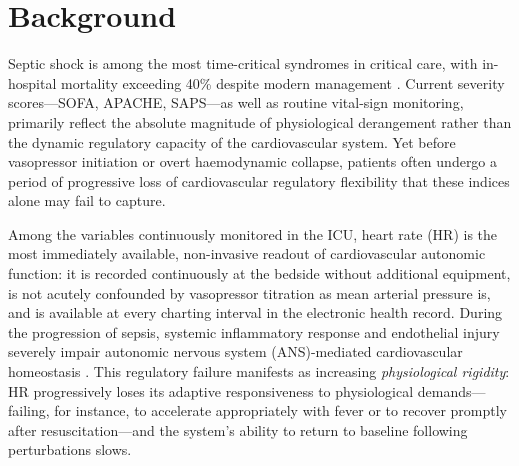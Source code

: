 \documentclass[referee,lineno,pdflatex]{sn-article-template/sn-jnl}
\begin{document}

\section{Background}
\label{sec:intro}

Septic shock is among the most time-critical syndromes in critical care,
with in-hospital mortality exceeding 40\% despite modern management \cite{singer2016}.
Current severity scores---SOFA, APACHE, SAPS---as well as routine vital-sign monitoring,
primarily reflect the absolute magnitude of physiological derangement rather than the
dynamic regulatory capacity of the cardiovascular system.
Yet before vasopressor initiation or overt haemodynamic collapse, patients often undergo
a period of progressive loss of cardiovascular regulatory flexibility that these indices
alone may fail to capture.

Among the variables continuously monitored in the ICU, heart rate (HR) is the most
immediately available, non-invasive readout of cardiovascular autonomic function:
it is recorded continuously at the bedside without additional equipment, is not acutely
confounded by vasopressor titration as mean arterial pressure is, and is available at
every charting interval in the electronic health record.
During the progression of sepsis, systemic inflammatory response and endothelial injury
severely impair autonomic nervous system (ANS)-mediated cardiovascular homeostasis
\cite{decastilho2018,adam2023}.
This regulatory failure manifests as increasing \emph{physiological rigidity}: HR
progressively loses its adaptive responsiveness to physiological demands---failing, for
instance, to accelerate appropriately with fever or to recover promptly after
resuscitation---and the system's ability to return to baseline following perturbations
slows.
\end{document}
